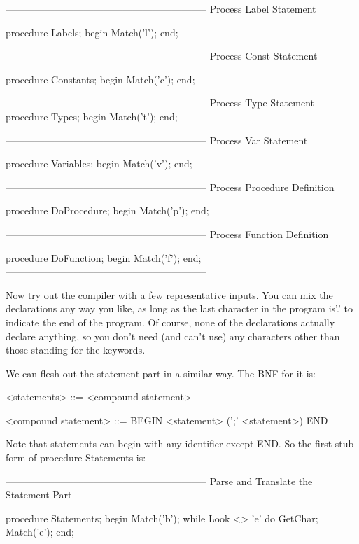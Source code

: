 \documentclass[float=false, crop=false]{standalone}
\begin{document}
\begin{code}
{--------------------------------------------------------------}
{ Process Label Statement }

procedure Labels;
begin
   Match('l');
end;


{--------------------------------------------------------------}
{ Process Const Statement }

procedure Constants;
begin
   Match('c');
end;


{--------------------------------------------------------------}
{ Process Type Statement }
procedure Types;
begin
   Match('t');
end;


{--------------------------------------------------------------}
{ Process Var Statement }

procedure Variables;
begin
   Match('v');
end;


{--------------------------------------------------------------}
{ Process Procedure Definition }

procedure DoProcedure;
begin
   Match('p');
end;


{--------------------------------------------------------------}
{ Process Function Definition }

procedure DoFunction;
begin
   Match('f');
end;
{--------------------------------------------------------------}
\end{code}

Now try out the compiler with a few representative inputs. You can mix the
declarations any way you like, as long as the last character in the program
is'.' to indicate the end of the program. Of course, none of the declarations
actually declare anything, so you don't need (and can't use) any characters
other than those standing for the keywords.

We can flesh out the statement part in a similar way. The BNF for it is:


     <statements> ::= <compound statement>

     <compound statement> ::= BEGIN <statement>
                                   (';' <statement>) END


Note that statements can begin with any identifier except END. So the first stub
form of procedure Statements is:

\begin{code}
{--------------------------------------------------------------}
{ Parse and Translate the Statement Part }

procedure Statements;
begin
   Match('b');
   while Look <> 'e' do
      GetChar;
   Match('e');
end;
{--------------------------------------------------------------}
\end{code}
\end{document}
